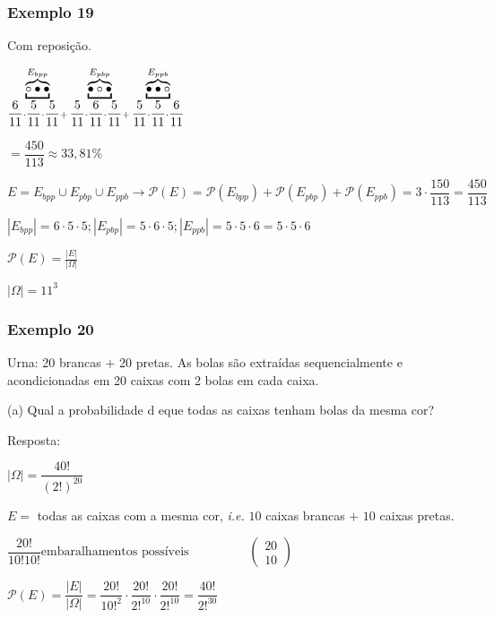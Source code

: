 \documentclass{article}
\begin{document}
	\subsubsection{Exemplo 19} \label{sssec:ex19}
	
	\noindent Com reposição.
	
	$ \underbracket{\overbrace{\circ \bullet \bullet}}^\text{$ E_{bpp} $}_{\dfrac{6}{11} \cdot \dfrac{5}{11} \cdot \dfrac{5}{11}+} \underbracket{\overbrace{\bullet \circ \bullet}}^\text{$ E_{pbp} $}_{\dfrac{5}{11} \cdot \dfrac{6}{11} \cdot \dfrac{5}{11}+} \underbracket{\overbrace{\bullet \bullet \circ}}^\text{$ E_{ppb} $}_{\dfrac{5}{11} \cdot \dfrac{5}{11} \cdot \dfrac{6}{11}} $
	
	$ = \dfrac{450}{113} \approx 33,81\% $
	
	$ E = E_{bpp} \cup E_{pbp} \cup E_{ppb} \rightarrow \mathcal{P}(E) = \mathcal{P}(E_{bpp}) + \mathcal{P}(E_{pbp}) + \mathcal{P}(E_{ppb}) = 3 \cdot \dfrac{150}{113} = \dfrac{450}{113} $
	
	$ |E_{bpp}| = 6 \cdot 5 \cdot 5; |E_{pbp}| = 5 \cdot 6 \cdot 5; |E_{ppb}| = 5 \cdot 5 \cdot 6 = 5 \cdot 5 \cdot 6 $ 
	
	$ \mathcal{P}(E) = \frac{|E|}{|\varOmega|} $
	
	$ |\varOmega| = 11^{3} $
	
	\subsubsection{Exemplo 20}
	
	\noindent Urna: 20 brancas + 20 pretas. As bolas são extraídas sequencialmente e acondicionadas em 20 caixas com 2 bolas em cada caixa.
	
	\noindent (a) Qual a probabilidade d eque todas as caixas tenham bolas da mesma cor?
	
	Resposta:
	
	$ |\varOmega| = \dfrac{40!}{(2!)^{20}} $
	
	$E =$ todas as caixas com a mesma cor, \textit{i.e.} $10$ caixas brancas + $10$ caixas pretas.
	
	$ \dfrac{20!}{10! 10!} \text{embaralhamentos possíveis} \hspace{2cm} \begin{pmatrix}
	20  \\
	10
	\end{pmatrix} $
	
	$ \mathcal{P}(E) = \dfrac{|E|}{|\varOmega|} = \dfrac{20!}{10!^{2}} \cdot \dfrac{20!}{2!^{10}} \cdot \dfrac{20!}{2!^{10}} = \dfrac{40!}{2!^{30}} $
	
\end{document}
